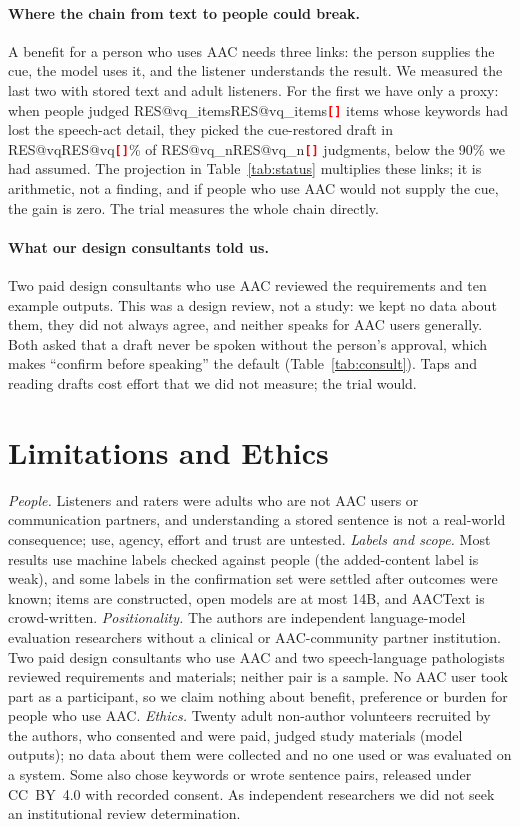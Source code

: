 \documentclass[letterpaper]{article} %
\makeatletter
\newcommand{\RES}[1]{\ifcsname RES@#1\endcsname\csname RES@#1\endcsname\else\RESmissing{#1}\fi}
\newcommand{\RESmissing}[1]{\textcolor{red}{\textbf{\texttt{[\detokenize{#1}]}}}}
\newcommand{\say}[1]{``#1''}
\makeatother
\begin{document}
\paragraph{Where the chain from text to people could break.}
A benefit for a person who uses AAC needs three links: the person supplies the cue, the model uses it, and the listener understands the result.
We measured the last two with stored text and adult listeners.
For the first we have only a proxy: when people judged \RES{vq_items} items whose keywords had lost the speech-act detail, they picked the cue-restored draft in \RES{vq}\% of \RES{vq_n} judgments, below the 90\% we had assumed.
The projection in Table~\ref{tab:status} multiplies these links; it is arithmetic, not a finding, and if people who use AAC would not supply the cue, the gain is zero.
The trial measures the whole chain directly.

\paragraph{What our design consultants told us.}
Two paid design consultants who use AAC reviewed the requirements and ten example outputs.
This was a design review, not a study: we kept no data about them, they did not always agree, and neither speaks for AAC users generally.
Both asked that a draft never be spoken without the person's approval, which makes \say{confirm before speaking} the default (Table~\ref{tab:consult}).
Taps and reading drafts cost effort that we did not measure; the trial would.



\section{Limitations and Ethics}
\label{sec:limits}
\emph{People.} Listeners and raters were adults who are not AAC users or communication partners, and understanding a stored sentence is not a real-world consequence; use, agency, effort and trust are untested.
\emph{Labels and scope.} Most results use machine labels checked against people (the added-content label is weak), and some labels in the confirmation set were settled after outcomes were known; items are constructed, open models are at most 14B, and AACText is crowd-written.
\emph{Positionality.} The authors are independent language-model evaluation researchers without a clinical or AAC-community partner institution.
Two paid design consultants who use AAC and two speech-language pathologists reviewed requirements and materials; neither pair is a sample.
No AAC user took part as a participant, so we claim nothing about benefit, preference or burden for people who use AAC.
\emph{Ethics.} Twenty adult non-author volunteers recruited by the authors, who consented and were paid, judged study materials (model outputs); no data about them were collected and no one used or was evaluated on a system. Some also chose keywords or wrote sentence pairs, released under CC~BY~4.0 with recorded consent. As independent researchers we did not seek an institutional review determination.
\end{document}
